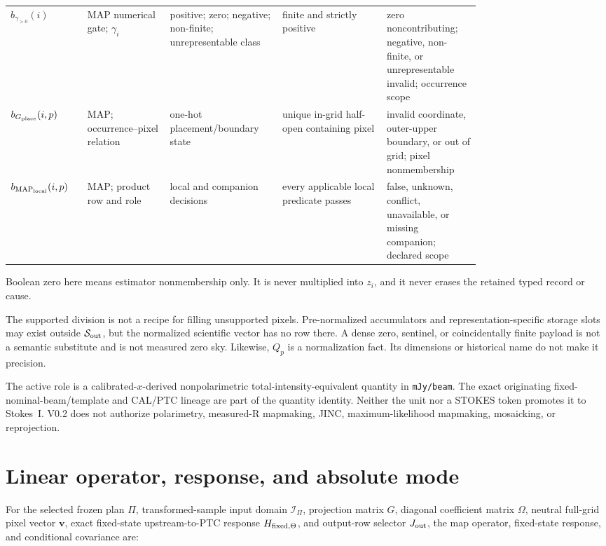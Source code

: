 \documentclass[10pt]{article}
\newcommand{\code}[1]{\nolinkurl{#1}}
\begin{document}
{\begin{longtable}{L{0.11\linewidth}L{0.15\linewidth}L{0.17\linewidth}L{0.19\linewidth}L{0.16\linewidth}}
\(b_{\gamma_{>0}}(i)\) & MAP numerical gate; \(\gamma_i\) & positive; zero; negative; non-finite; unrepresentable class & finite and strictly positive & zero noncontributing; negative, non-finite, or unrepresentable invalid; occurrence scope\\
\(b_{G_{\rm place}}(i,p)\) & MAP; occurrence--pixel relation & one-hot placement/boundary state & unique in-grid half-open containing pixel & invalid coordinate, outer-upper boundary, or out of grid; pixel nonmembership\\
\(b_{{\rm MAP}_{\rm local}}(i,p)\) & MAP; product row and role & local and companion decisions & every applicable local predicate passes & false, unknown, conflict, unavailable, or missing companion; declared scope\\
\bottomrule
\end{longtable}
}

Boolean zero here means estimator nonmembership only. It is never multiplied
into \(z_i\), and it never erases the retained typed record or cause.

The supported division is not a recipe for filling unsupported pixels.
Pre-normalized accumulators and representation-specific storage slots may exist outside
\(\mathcal S_{\rm out}\), but the normalized scientific vector has no row
there. A dense zero, sentinel, or coincidentally finite payload is not a
semantic substitute and is not measured zero sky. Likewise, \(Q_p\) is a
normalization fact. Its dimensions or historical name do not make it
precision.

The active role is a calibrated-\(x\)-derived nonpolarimetric
total-intensity-equivalent quantity in \code{mJy/beam}. The exact originating
fixed-nominal-beam/template and CAL/PTC lineage are part of the quantity
identity. Neither the unit nor a STOKES token promotes it to Stokes~I. V0.2
does not authorize polarimetry, measured-R mapmaking, JINC,
maximum-likelihood mapmaking, mosaicking, or reprojection.

\clearpage
\section{Linear operator, response, and absolute mode}

For the selected frozen plan \(\Pi\), transformed-sample input domain
\(\mathcal I_\Pi\), projection matrix \(G\), diagonal coefficient matrix
\(\Omega\), neutral full-grid pixel vector \(\boldsymbol v\), exact fixed-state
upstream-to-PTC response \(H_{{\rm fixed},\Theta}\), and output-row selector
\(J_{\rm out}\), the map operator, fixed-state response, and conditional
covariance are:
\end{document}
